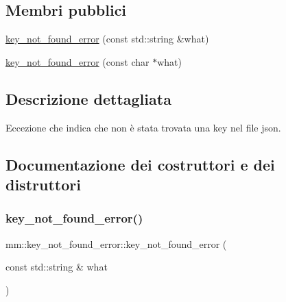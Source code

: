 \subsection*{Membri pubblici}
\begin{DoxyCompactItemize}
\item 
\mbox{\hyperlink{classmm_1_1key__not__found__error_a2dbffa57a8ad2c3d80151f0d7b75814b}{key\+\_\+not\+\_\+found\+\_\+error}} (const std\+::string \&what)
\item 
\mbox{\hyperlink{classmm_1_1key__not__found__error_a650fb3f9d373793d9ba049e863eeef2d}{key\+\_\+not\+\_\+found\+\_\+error}} (const char $\ast$what)
\end{DoxyCompactItemize}


\subsection{Descrizione dettagliata}
Eccezione che indica che non è stata trovata una key nel file json. 

\subsection{Documentazione dei costruttori e dei distruttori}
\mbox{\label{classmm_1_1key__not__found__error_a2dbffa57a8ad2c3d80151f0d7b75814b}} 
\subsubsection{\texorpdfstring{key\+\_\+not\+\_\+found\+\_\+error()}{key\_not\_found\_error()}\hspace{0.1cm}{\footnotesize\ttfamily [1/2]}}
{\footnotesize\ttfamily mm\+::key\+\_\+not\+\_\+found\+\_\+error\+::key\+\_\+not\+\_\+found\+\_\+error (\begin{DoxyParamCaption}\item[{const std\+::string \&}]{what }\end{DoxyParamCaption})}

\mbox{\label{classmm_1_1key__not__found__error_a650fb3f9d373793d9ba049e863eeef2d}} 
